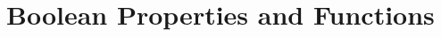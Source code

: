 
\chapter{Boolean Properties and Functions}
\label{ap:ch:boolean_properties_and_functions}

\begin{tabular}{ccc}


\end{tabular}
